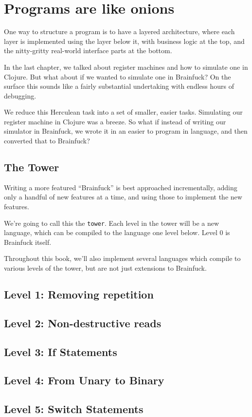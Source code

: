\chapter{Programs are like onions}

One way to structure a program is to have a layered architecture,
where each layer is implemented using the layer below it, with
business logic at the top, and the nitty-gritty real-world interface
parts at the bottom.

In the last chapter, we talked about register machines and how to
simulate one in Clojure. But what about if we wanted to simulate one
in Brainfuck? On the surface this sounds like a fairly substantial
undertaking with endless hours of debugging.

We reduce this Herculean task into a set of smaller, easier tasks.
Simulating our register machine in Clojure was a breeze.  So what if
instead of writing our simulator in Brainfuck, we wrote it in an
easier to program in language, and then converted that to Brainfuck?

\section{The Tower}

Writing a more featured ``Brainfuck'' is best approached
incrementally, adding only a handful of new features at a time, and
using those to implement the new features.

We're going to call this the {\tt tower}.  Each level in the tower
will be a new language, which can be compiled to the language one
level below. Level 0 is Brainfuck itself.

Throughout this book, we'll also implement several languages which
compile to various levels of the tower, but are not just extensions to
Brainfuck.

\section{Level 1: Removing repetition}

\section{Level 2: Non-destructive reads}

\section{Level 3: If Statements}

\section{Level 4: From Unary to Binary}

\section{Level 5: Switch Statements}

